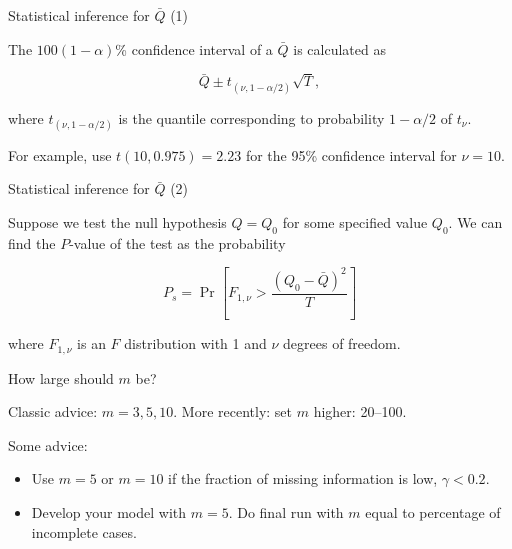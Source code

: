 \documentclass[ignorenonframetext,aspectratio=43]{beamer}
\providecommand{\tightlist}{%
  \setlength{\itemsep}{0pt}\setlength{\parskip}{0pt}}
\begin{document}
\begin{frame}{Statistical inference for \(\bar Q\) (1)}
\protect\hypertarget{statistical-inference-for-bar-q-1}{}

The \(100(1-\alpha)\)\% confidence interval of a \(\bar Q\) is
calculated as

\[
\bar Q \pm t_{(\nu,1-\alpha/2)}\sqrt{T},
\]

where \(t_{(\nu,1-\alpha/2)}\) is the quantile corresponding to
probability \(1-\alpha/2\) of \(t_\nu\).

For example, use \(t(10,0.975)=2.23\) for the 95\% confidence interval
for \(\nu=10\).

\end{frame}

\begin{frame}{Statistical inference for \(\bar Q\) (2)}
\protect\hypertarget{statistical-inference-for-bar-q-2}{}

Suppose we test the null hypothesis \(Q=Q_0\) for some specified value
\(Q_0\). We can find the \(P\)-value of the test as the probability

\[
  P_s = \Pr\left[F_{1,\nu} > \frac{(Q_0 - \bar Q)^2}{T}\right]
\]

where \(F_{1,\nu}\) is an \(F\) distribution with 1 and \(\nu\) degrees
of freedom.

\end{frame}

\begin{frame}{How large should \(m\) be?}
\protect\hypertarget{how-large-should-m-be}{}

Classic advice: \(m=3, 5, 10\). More recently: set \(m\) higher:
20--100.

Some advice:

\begin{itemize}
\tightlist
\item
  Use \(m=5\) or \(m=10\) if the fraction of missing information is low,
  \(\gamma <0.2\).
\item
  Develop your model with \(m=5\). Do final run with \(m\) equal to
  percentage of incomplete cases.
\end{itemize}

\end{frame}
\end{document}
